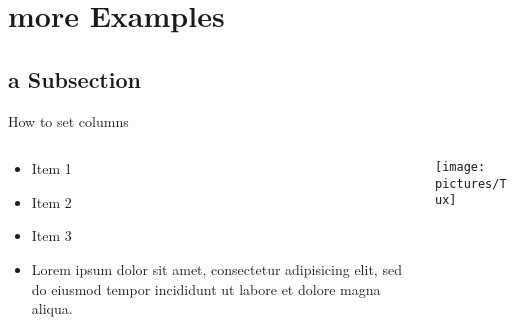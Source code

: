 \documentclass[]{beamer}
\begin{document}
\section{more Examples}

\subsection{a Subsection}

\begin{frame}{How to set columns}
  \begin{columns}[T]
    \begin{column}{.45\textwidth}
      \begin{itemize}
        \item Item 1
        \item Item 2
        \item Item 3
        \item Lorem ipsum dolor sit amet, consectetur adipisicing elit, sed do eiusmod tempor incididunt ut labore et dolore magna aliqua. 
      \end{itemize}
    \end{column}
    \begin{column}{.45\textwidth}
      \texttt{[image: pictures/Tux]}
    \end{column}
  \end{columns}
\end{frame}
\end{document}
